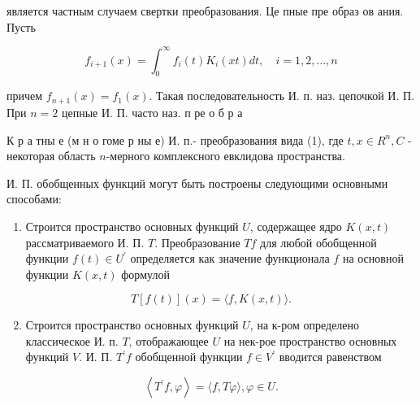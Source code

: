 \documentclass[10pt]{article}
\begin{document}
является частным случаем свертки преобразования. Це пные пре образ ов ания. Пусть



\[

f_{i+1}(x)=\int_{0}^{\infty} f_{i}(t) K_{i}(x t) d t, \quad i=1,2, \ldots, n

\]



причем $f_{n+1}(x)=f_{1}(x)$. Такая последовательность И. п. наз. цепочкой И. П. При $n=2$ цепные И. П. часто наз. п ре о б р а



К р а тны е (м н о гоме р ны е) И. п.- преобразования вида (1), где $t, x \in R^{n}, C$ - некоторая область $n$-мерного комплексного евклидова пространства.



И. П. обобщенных функций могут быть построены следующими основными способами:



\begin{enumerate}

  \item Строится пространство основных функций $U$, содержащее ядро $K(x, t)$ рассматриваемого И. П. $T$. Преобразование $T f$ для любой обобщенной функции $f(t) \in U^{\prime}$ определяется как значение функционала $f$ на основной функции $K(x, t)$ формулой

\end{enumerate}



\[

T[f(t)](x)=\langle f, K(x, t)\rangle .

\]



\begin{enumerate}

  \setcounter{enumi}{1}

  \item Строится пространство основных функций $U$, на к-ром определено классическое И. п. $T$, отображающее $U$ на нек-рое пространство основных функций $V$. И. П. $T^{\prime} f$ обобщенной функции $f \in V^{\prime}$ вводится равенством

\end{enumerate}



\[

\left\langle T^{\prime} f, \varphi\right\rangle=\langle f, T \varphi\rangle, \varphi \in U .

\]
\end{document}
